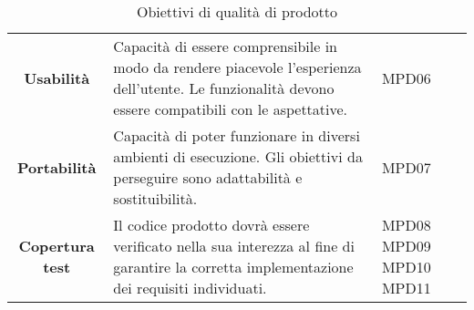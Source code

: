 \begin{table}[H]
\begin{tabular}{c|p{8cm}|p{2cm}}
    \textbf{Usabilità}                                           & Capacità di essere comprensibile in modo da rendere piacevole l'esperienza dell'utente. Le funzionalità devono essere compatibili con le aspettative. & MPD06                   \\
    \textbf{Portabilità}                                         & Capacità di poter funzionare in diversi ambienti di esecuzione. Gli obiettivi da perseguire sono adattabilità e sostituibilità.                       & MPD07                   \\
    \textbf{Copertura test}                                      & Il codice prodotto dovrà essere verificato nella sua interezza al fine di garantire la corretta implementazione dei requisiti individuati.            & MPD08 MPD09 MPD10 MPD11 \\
  \end{tabular}
  \caption{Obiettivi di qualità di prodotto}
\end{table}


